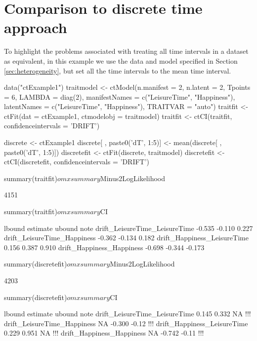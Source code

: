 \documentclass[nojss]{jss}\usepackage[]{graphicx}\usepackage[]{color}
\begin{document}
\section{Comparison to discrete time approach}\label{appendix:discretecomparison}\nopagebreak
To highlight the problems associated with treating all time intervals in a dataset as equivalent, in this example we use the data and model specified in Section \ref{sec:heterogeneity}, but set all the time intervals to the mean time interval. 

\begin{Schunk}
\begin{Sinput}
data("ctExample1")
traitmodel <- ctModel(n.manifest = 2, n.latent = 2, Tpoints = 6, 
  LAMBDA = diag(2), manifestNames = c("LeisureTime", "Happiness"), 
  latentNames = c("LeisureTime", "Happiness"), TRAITVAR = "auto")
traitfit <- ctFit(dat = ctExample1, ctmodelobj = traitmodel)
traitfit <- ctCI(traitfit, confidenceintervals = 'DRIFT')

discrete <- ctExample1
discrete[ , paste0('dT', 1:5)] <- mean(discrete[ , paste0('dT', 1:5)])
discretefit <- ctFit(discrete, traitmodel)
discretefit <- ctCI(discretefit, confidenceintervals = 'DRIFT')

summary(traitfit)$omxsummary$Minus2LogLikelihood
\end{Sinput}
\begin{Soutput}
[1] 4151
\end{Soutput}
\begin{Sinput}
summary(traitfit)$omxsummary$CI
\end{Sinput}
\begin{Soutput}
                              lbound estimate ubound note
drift_LeisureTime_LeisureTime -0.535   -0.110  0.227     
drift_LeisureTime_Happiness   -0.362   -0.134  0.182     
drift_Happiness_LeisureTime    0.156    0.387  0.910     
drift_Happiness_Happiness     -0.698   -0.344 -0.173     
\end{Soutput}
\begin{Sinput}
summary(discretefit)$omxsummary$Minus2LogLikelihood
\end{Sinput}
\begin{Soutput}
[1] 4203
\end{Soutput}
\begin{Sinput}
summary(discretefit)$omxsummary$CI
\end{Sinput}
\begin{Soutput}
                              lbound estimate ubound note
drift_LeisureTime_LeisureTime  0.145    0.332     NA  !!!
drift_LeisureTime_Happiness       NA   -0.300  -0.12  !!!
drift_Happiness_LeisureTime    0.229    0.951     NA  !!!
drift_Happiness_Happiness         NA   -0.742  -0.11  !!!
\end{Soutput}
\end{Schunk}
\end{document}
